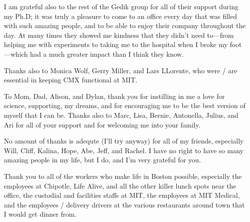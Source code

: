 I am grateful also to the rest of the Gedik group for all of their support during my Ph.D; it was truly a pleasure to come to an office every day that was filled with such amazing people, and to be able to enjoy their company throughout the day.
At many times they showed me kindness that they didn't need to---from helping me with experiments to taking me to the hospital when I broke my foot---which had a much greater impact than I think they know.

Thanks also to Monica Wolf, Gerry Miller, and Lars LLorente, who were / are essential in keeping CMX functional at MIT.

To Mom, Dad, Alison, and Dylan, thank you for instilling in me a love for science, supporting, my dreams, and for encouraging me to be the best version of myself that I can be.
Thanks also to Marc, Lisa, Bernie, Antonella, Julius, and Ari for all of your support and for welcoming me into your family.

No amount of thanks is adequte (I'll try anyway) for all of my friends, especially Will, Cliff, Kalina, Hope, Abe, Jeff, and Rachel.
I have no right to have so many amazing people in my life, but I do, and I'm very grateful for you.

Thank you to all of the workers who make life in Boston possible, especially the employees at Chipotle, Life Alive, and all the other killer lunch spots near the office, the custodial and facilities staffs at MIT, the employees at MIT Medical, and the employees / delivery drivers at the various restaurants around town that I would get dinner from.

